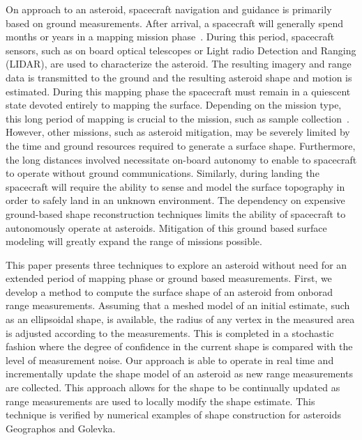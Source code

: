 \documentclass[journal]{new-aiaa}
\begin{document}
On approach to an asteroid, spacecraft navigation and guidance is primarily based on ground measurements.
After arrival, a spacecraft will generally spend months or years in a mapping mission phase~\cite{kubota2003,cole1998}.
During this period, spacecraft sensors, such as on board optical telescopes or Light radio Detection and Ranging (LIDAR), are used to characterize the asteroid.
The resulting imagery and range data is transmitted to the ground and the resulting asteroid shape and motion is estimated. 
During this mapping phase the spacecraft must remain in a quiescent state devoted entirely to mapping the surface.
Depending on the mission type, this long period of mapping is crucial to the mission, such as sample collection~\cite{gates2015}. 
However, other missions, such as asteroid mitigation, may be severely limited by the time and ground resources required to generate a surface shape.
Furthermore, the long distances involved necessitate on-board autonomy to enable to spacecraft to operate without ground communications.
Similarly, during landing the spacecraft will require the ability to sense and model the surface topography in order to safely land in an unknown environment.
The dependency on expensive ground-based shape reconstruction techniques limits the ability of spacecraft to autonomously operate at asteroids.
Mitigation of this ground based surface modeling will greatly expand the range of missions possible.

This paper presents three techniques to explore an asteroid without need for an extended period of mapping phase or ground based measurements. 
First, we develop a method to compute the surface shape of an asteroid from onborad range measurements.
Assuming that a meshed model of an initial estimate, such as an ellipsoidal shape, is available, the radius of any vertex in the measured area is adjusted according to the measurements. 
This is completed in a stochastic fashion where the degree of confidence in the current shape is compared with the level of measurement noise. 
Our approach is able to operate in real time and incrementally update the shape model of an asteroid as new range measurements are collected.
This approach allows for the shape to be continually updated as range measurements are used to locally modify the shape estimate.
This technique is verified by numerical examples of shape construction for asteroids Geographos and Golevka. 
\end{document}

